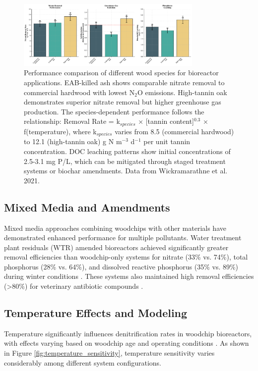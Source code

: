 \documentclass[12pt,a4paper]{article}
\begin{document}
\begin{figure}[H]
\centering
\includegraphics[width=0.8\textwidth]{fig9_wood_species_comparison_scientific}
\caption{Performance comparison of different wood species for bioreactor applications. EAB-killed ash shows comparable nitrate removal to commercial hardwood with lowest N$_2$O emissions. High-tannin oak demonstrates superior nitrate removal but higher greenhouse gas production. The species-dependent performance follows the relationship: Removal Rate = k$_{species}$ × [tannin content]$^{0.3}$ × f(temperature), where k$_{species}$ varies from 8.5 (commercial hardwood) to 12.1 (high-tannin oak) g N m$^{-3}$ d$^{-1}$ per unit tannin concentration. DOC leaching patterns show initial concentrations of 2.5-3.1 mg P/L, which can be mitigated through staged treatment systems or biochar amendments. Data from Wickramarathne et al. 2021.}
\label{fig:wood_species_comparison}
\end{figure}

\subsection{Mixed Media and Amendments}

Mixed media approaches combining woodchips with other materials have demonstrated enhanced performance for multiple pollutants. Water treatment plant residuals (WTR) amended bioreactors achieved significantly greater removal efficiencies than woodchip-only systems for nitrate (33\% vs. 74\%), total phosphorus (28\% vs. 64\%), and dissolved reactive phosphorus (35\% vs. 89\%) during winter conditions \citep{RN370}. These systems also maintained high removal efficiencies (>80\%) for veterinary antibiotic compounds \citep{RN370}.

\subsection{Temperature Effects and Modeling}

Temperature significantly influences denitrification rates in woodchip bioreactors, with effects varying based on woodchip age and operating conditions \citep{RN228, RN242}. As shown in Figure \ref{fig:temperature_sensitivity}, temperature sensitivity varies considerably among different system configurations.
\end{document}
